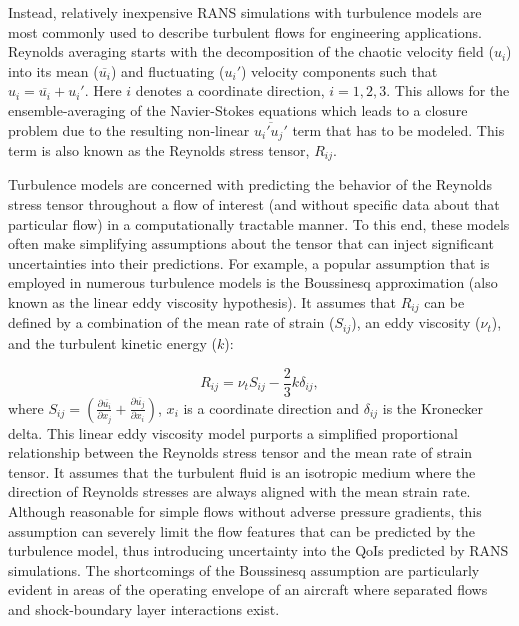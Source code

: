 Instead, relatively inexpensive RANS simulations with turbulence models are most commonly used to describe turbulent flows for engineering applications. Reynolds averaging starts with the decomposition of the chaotic velocity field ($ u_i$) into its mean ($\overline{u_i}$) and fluctuating ($u_i'$) velocity components such that $u_i = \overline{u_i} + u_i'$. Here $i$ denotes a coordinate direction, $i=1, 2, 3$. This allows for the ensemble-averaging of the Navier-Stokes equations \cite{pope_2000} which leads to a closure problem due to the resulting non-linear $\overline{u_i'u_j'}$ term that has to be modeled. This term is also known as the Reynolds stress tensor, $R_{ij}$. 

Turbulence models are concerned with predicting the behavior of the Reynolds stress tensor throughout a flow of interest (and without specific data about that particular flow) in a computationally tractable manner. To this end, these models often make simplifying assumptions about the tensor that can inject significant uncertainties into their predictions. For example, a popular assumption that is employed in numerous turbulence models is the Boussinesq approximation (also known as the linear eddy viscosity hypothesis). It assumes that $R_{ij}$ can be defined by a combination of the mean rate of strain ($S_{ij}$), an eddy viscosity ($\nu_t$), and the turbulent kinetic energy ($k$):
 
 \begin{equation}
     R_{ij} = \nu_t S_{ij} - \frac{2}{3} k \delta_{ij},
 \end{equation}
where $S_{ij} = \left ( \frac{\partial \overline{u_i}}{\partial x_j} + \frac{\partial \overline{u_j}}{\partial x_i} \right )$, $x_i$ is a coordinate direction and $\delta_{ij}$ is the Kronecker delta. This linear eddy viscosity model purports a simplified proportional relationship between the Reynolds stress tensor and the mean rate of strain tensor. It assumes that the turbulent fluid is an isotropic medium where the direction of Reynolds stresses are always aligned with the mean strain rate. Although reasonable for simple flows without adverse pressure gradients, this assumption can severely limit the flow features that can be predicted by the turbulence model, thus introducing uncertainty into the QoIs predicted by RANS simulations. The shortcomings of the Boussinesq assumption are particularly evident in areas of the operating envelope of an aircraft where separated flows and shock-boundary layer interactions exist. 

